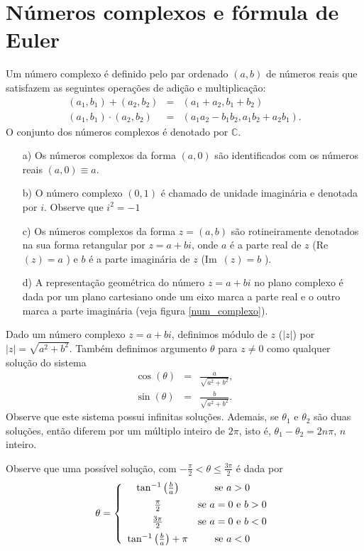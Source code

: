 \section{Números complexos e fórmula de Euler}
\begin{defn} Um número complexo é definido pelo par ordenado $(a,b)$ de números reais que satisfazem as seguintes operações de adição e multiplicação:
\begin{eqnarray*}
(a_1,b_1)+(a_2,b_2)&=&(a_1+a_2,b_1+b_2)\\
(a_1,b_1)\cdot(a_2,b_2)&=&(a_1a_2-b_1b_2,a_1b_2+a_2b_1).
\end{eqnarray*}
O conjunto dos números complexos é denotado por $\mathbb{C}$.
\end{defn}
\begin{obs}
\begin{itemize} (Números complexos)
\item[a)] Os números complexos da forma $(a,0)$ são identificados com os números reais $(a,0)\equiv a$.
\item[b)] O número complexo $(0,1)$ é chamado de unidade imaginária e denotada por $i$. Observe que $i^2=-1$
\item[c)] Os números complexos da forma $z=(a,b)$ são rotineiramente denotados na sua forma retangular por $z=a+bi$, onde $a$ é a parte real de $z$ (Re\ \!$(z)=a$ ) e $b$ é a parte imaginária de $z$ (Im\ \!$(z)=b$ ).
\item[d)] A representação geométrica do número $z=a+bi$ no plano complexo é dada por um plano cartesiano onde um eixo marca a parte real e o outro marca a parte imaginária (veja figura \ref{num_complexo}).
\end{itemize}
\end{obs}

\begin{defn}Dado um número complexo $z=a+bi$, definimos módulo de $z$ ($|z|$) por $|z|=\sqrt{a^2+b^2}$. Também definimos argumento $\theta$ para $z\neq 0$ como qualquer  solução do sistema
\begin{eqnarray}
 \cos(\theta)&=&\frac{a}{\sqrt{a^2+b^2}},\\
 \sin(\theta)&=&\frac{b}{\sqrt{a^2+b^2}}.
\end{eqnarray}
Observe que este sistema possui infinitas soluções. Ademais, se $\theta_1$ e $\theta_2$ são duas soluções, então diferem por um múltiplo inteiro de $2\pi$, isto é, $\theta_1-\theta_2=2n\pi$, $n$ inteiro.
\end{defn}

Observe que uma possível solução, com $-\frac{\pi}{2}<\theta\leq \frac{3\pi}{2}$ é dada por
$$
\theta=\left\{\begin{array}{cc}\tan^{-1}\left(\frac{b}{a}\right)&\hbox{se}\ a>0\\[5pt]
\frac{\pi}{2}&\hbox{se}\ a=0\ \hbox{e}\ b>0\\[5pt]
\frac{3\pi}{2}&\hbox{se}\ a=0\ \hbox{e}\ b<0 \\[5pt] 
\tan^{-1}\left(\frac{b}{a}\right)+\pi&\hbox{se}\ a<0\end{array}\right.
$$


